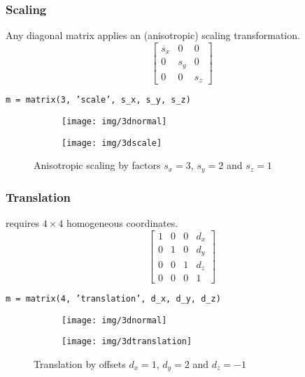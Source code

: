 \documentclass{scrartcl}
\begin{document}
\subsubsection*{Scaling}
Any diagonal matrix applies an (anisotropic) scaling transformation.
$$\left[ \begin{smallmatrix} 
s_x & 0 & 0\\
0 & s_y & 0\\
0 & 0 & s_z 
\end{smallmatrix} \right]$$
\begin{center}
	\texttt{m = matrix(3, 'scale', s\_x, s\_y, s\_z)}
\end{center}
\begin{figure}[H]
	\centering
	\begin{subfigure}{.41\textwidth}
		\centering
		\texttt{[image: img/3dnormal]}
	\end{subfigure}%
	\begin{subfigure}{.41\textwidth}
		\centering
		\texttt{[image: img/3dscale]}
	\end{subfigure}
	\caption{Anisotropic scaling by factors $s_x = 3$, $s_y = 2$ and $s_z = 1$}
	\label{fig:rot}
\end{figure}
\subsubsection*{Translation}
requires $4 \times 4$ homogeneous coordinates.
$$\left[ \begin{smallmatrix} 
1 & 0 & 0 & d_x\\
0 & 1 & 0 & d_y\\
0 & 0 & 1 & d_z\\
0 & 0 & 0 & 1 
\end{smallmatrix} \right]$$

\begin{center}
	\texttt{m = matrix(4, 'translation', d\_x, d\_y, d\_z)}
\end{center}
\begin{figure}[H]
	\centering
	\begin{subfigure}{.41\textwidth}
		\centering
		\texttt{[image: img/3dnormal]}
	\end{subfigure}%
	\begin{subfigure}{.41\textwidth}
		\centering
		\texttt{[image: img/3dtranslation]}
	\end{subfigure}
	\caption{Translation by offsets $d_x = 1$, $d_y = 2$ and $d_z = -1$}
	\label{fig:rot}
\end{figure}
\end{document}
